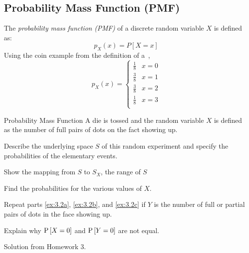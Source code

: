 \subsection{Probability Mass Function  (PMF)}\label{subsec:Probability Mass Function}
\begin{definition}\label{def:Probability Mass Function}
  The \emph{probability mass function (PMF)} of a discrete random variable $X$ is defined as:
  \begin{equation}\label{eq:Probability Mass Function}
    p_{X} \left( x \right) = P \left[ X=x \right]
  \end{equation}
  Using the coin example from the definition of a~,
  \begin{equation}
    p_{X} \left( x \right) =
    \begin{cases}
      \frac{1}{8} & x=0 \\
      \frac{3}{8} & x=1 \\
      \frac{3}{8} & x=2 \\
      \frac{1}{8} & x=3 \\
    \end{cases}
  \end{equation}
\end{definition}
\begin{example}[Problem 3.2]{Probability Mass Function}
  A die is tossed and the random variable $X$ is defined as the number of full pairs of dots on the fact showing up.
  \begin{boldalphlist}[label=\textbf{(\alph*)}, ref=(\alph*)]
  \item Describe the underlying space $S$ of this random experiment and specify the probabilities of the elementary events.\label{ex:3.2a}
  \item Show the mapping from $S$ to $S_{X}$, the range of $S$\label{ex:3.2b}
  \item Find the probabilities for the various values of $X$.\label{ex:3.2c}
  \item Repeat parts \ref{ex:3.2a}, \ref{ex:3.2b}, and \ref{ex:3.2c} if $Y$ is the number of full or partial pairs of dots in the face showing up.
  \item Explain why $\operatorname{\operatorname{P}} \left[ X = 0 \right]$ and $\operatorname{\operatorname{P}} \left[ Y = 0 \right]$ are not equal.
  \end{boldalphlist}

  \tcblower

  Solution from Homework 3.
\end{example}

